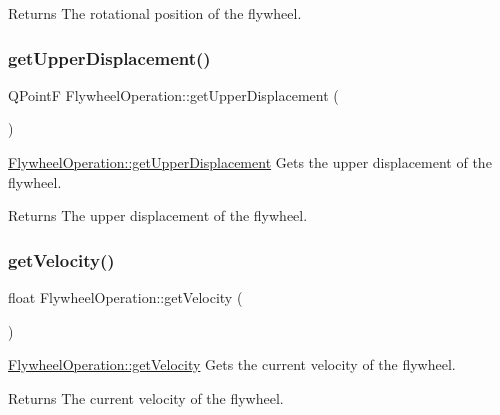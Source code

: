 \begin{DoxyReturn}{Returns}
The rotational position of the flywheel. 
\end{DoxyReturn}
\hypertarget{class_flywheel_operation_a16ebc2fe8c3297350eaf9be2114a75c8}{}\label{class_flywheel_operation_a16ebc2fe8c3297350eaf9be2114a75c8} 
\subsubsection{\texorpdfstring{get\+Upper\+Displacement()}{getUpperDisplacement()}}
{\footnotesize\ttfamily Q\+PointF Flywheel\+Operation\+::get\+Upper\+Displacement (\begin{DoxyParamCaption}{ }\end{DoxyParamCaption})}



\hyperlink{class_flywheel_operation_a16ebc2fe8c3297350eaf9be2114a75c8}{Flywheel\+Operation\+::get\+Upper\+Displacement} Gets the upper displacement of the flywheel. 

\begin{DoxyReturn}{Returns}
The upper displacement of the flywheel. 
\end{DoxyReturn}
\hypertarget{class_flywheel_operation_a06119af2250971d23869d94fd451ceba}{}\label{class_flywheel_operation_a06119af2250971d23869d94fd451ceba} 
\subsubsection{\texorpdfstring{get\+Velocity()}{getVelocity()}}
{\footnotesize\ttfamily float Flywheel\+Operation\+::get\+Velocity (\begin{DoxyParamCaption}{ }\end{DoxyParamCaption})}



\hyperlink{class_flywheel_operation_a06119af2250971d23869d94fd451ceba}{Flywheel\+Operation\+::get\+Velocity} Gets the current velocity of the flywheel. 

\begin{DoxyReturn}{Returns}
The current velocity of the flywheel. 
\end{DoxyReturn}
\hypertarget{class_flywheel_operation_a307929c750339cb2b46baaafa526d29f}{}\label{class_flywheel_operation_a307929c750339cb2b46baaafa526d29f} 
